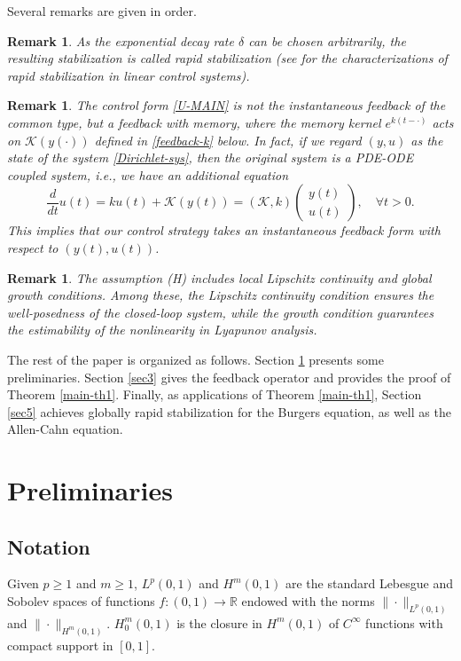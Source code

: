 \documentclass[review]{elsarticle}
\newtheorem{remark}[theorem]{Remark}
\numberwithin{equation}{section}
\begin{document}
Several remarks are given in order.

\begin{remark}
   As the exponential decay rate $\delta$ can be chosen arbitrarily, the resulting stabilization is called rapid stabilization (see \cite{LWXY,TWX} for the characterizations of rapid stabilization in linear control systems).
\end{remark}
\begin{remark}
   The control form \eqref{U-MAIN} is not the instantaneous feedback of the common type, but a feedback with memory, where the memory kernel $e^{k (t-\cdot)}$ acts on $\mathcal{K}(y(\cdot))$ defined in \eqref{feedback-k} below. In fact, if we regard $(y,u)$ as the state of the system \eqref{Dirichlet-sys}, then the original system is a PDE-ODE coupled system, i.e., we have an additional equation
    $$
    \frac{d}{dt}u(t)=ku(t)+\mathcal{K}(y(t))=\left(\mathcal{K},k\right)\begin{pmatrix}
        y(t)\\ u(t) \end{pmatrix},\quad \forall t>0.
    $$
    This implies that our control strategy takes an instantaneous feedback form with respect to $(y(t),u(t))$.
\end{remark}
\begin{remark}
The assumption (H) includes local Lipschitz continuity and global growth conditions. Among these, the Lipschitz continuity condition ensures the well-posedness of the closed-loop system, while the growth condition guarantees the estimability of the nonlinearity in Lyapunov analysis.
\end{remark}

The rest of the paper is organized as follows. Section \ref{sec2} presents some preliminaries. Section \ref{sec3} gives the feedback operator and provides the proof of {Theorem} \ref{main-th1}. Finally, as applications of {Theorem} \ref{main-th1}, {Section \ref{sec5} achieves globally rapid stabilization for the Burgers equation, as well as the Allen-Cahn equation.}

 




\section{Preliminaries}\label{sec2}
\subsection{Notation}
Given $p\ge 1$ and $m\ge 1$, $L^p(0,1)$ and $H^m(0,1)$ are the standard Lebesgue and Sobolev spaces of functions $f:(0,1)\to \mathbb{R}$ endowed with the norms $\|\cdot\|_{L^p(0,1)}$ and $\|\cdot\|_{H^m(0,1)}$. $H_0^{m}(0,1)$ is the closure in $H^{m}(0,1)$ of $C^{\infty}$ functions with compact support in $[0,1]$.
 
\end{document}
